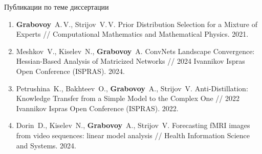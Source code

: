 \documentclass[9pt,pdf,hyperref={unicode}]{beamer}
\begin{document}
\begin{frame}{Публикации по теме диссертации}
\begin{enumerate}
    \item \textbf{Grabovoy}~A.\,V., Strijov~V.\,V. Prior Distribution Selection for a Mixture of Experts // Computational Mathematics and Mathematical Physics. 2021.
    \item Meshkov~V., Kiselev~N., \textbf{Grabovoy}~A. ConvNets Landscape Convergence: Hessian-Based Analysis of Matricized Networks // 2024 Ivannikov Ispras Open Conference (ISPRAS). 2024.
    \item Petrushina~K., Bakhteev~O., \textbf{Grabovoy}~A., Strijov~V. Anti-Distillation: Knowledge Transfer from a Simple Model to the Complex One // 2022 Ivannikov Ispras Open Conference (ISPRAS). 2022.
    \item Dorin~D., Kiselev~N., \textbf{Grabovoy}~A., Strijov~V. Forecasting fMRI images from video sequences: linear model analysis // Health Information Science and Systems. 2024.
\end{enumerate}
\end{frame}
\end{document}
